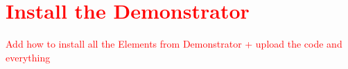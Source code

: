 \chapter{\textcolor{red}{Install the Demonstrator}}
\textcolor{red}{ Add how to install all the Elements from Demonstrator + upload the code and everything}